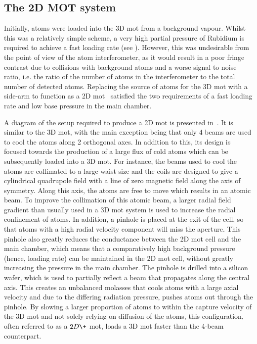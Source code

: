 \subsection{The 2D MOT system}\label{sec:2d_mot}
Initially, atoms were loaded into the 3D \ac{mot} from a background vapour. Whilst this was a relatively simple scheme, a very high partial pressure of Rubidium is required to achieve a fast loading rate (see ). However, this was undesirable from the point of view of the atom interferometer, as it would result in a poor fringe contrast due to collisions with background atoms and a worse signal to noise ratio, i.e. the ratio of the number of atoms in the interferometer to the total number of detected atoms. Replacing the source of atoms for the 3D \ac{mot} with a side-arm to function as a 2D \ac{mot}~\cite{Dieckmann1998} satisfied the two requirements of a fast loading rate and low base pressure in the main chamber. \par\noindent
A diagram of the setup required to produce a 2D \ac{mot} is presented in~. It is similar to the 3D \ac{mot}, with the main exception being that only 4 beams are used to cool the atoms along 2 orthogonal axes. In addition to this, its design is focused towards the production of a large flux of cold atoms which can be subsequently loaded into a 3D \ac{mot}. For instance, the beams used to cool the atoms are collimated to a large waist size and the coils are designed to give a cylindrical quadrupole field with a line of zero magnetic field along the axis of symmetry. Along this axis, the atoms are free to move which results in an atomic beam. To improve the collimation of this atomic beam, a larger radial field gradient than usually used in a 3D \ac{mot} system is used to increase the radial confinement of atoms. In addition, a pinhole is placed at the exit of the cell, so that atoms with a high radial velocity component will miss the aperture. This pinhole also greatly reduces the conductance between the 2D \ac{mot} cell and the main chamber, which means that a comparatively high background pressure (hence, loading rate) can be maintained in the 2D \ac{mot} cell, without greatly increasing the pressure in the main chamber. The pinhole is drilled into a silicon wafer, which is used to partially reflect a beam that propagates along the central axis. This creates an unbalanced molasses that cools atoms with a large axial velocity and due to the differing radiation pressure, pushes atoms out through the pinhole. By slowing a larger proportion of atoms to within the capture velocity of the 3D \ac{mot} and not solely relying on diffusion of the atoms, this configuration, often referred to as a \(2D\+\) \ac{mot}, loads a 3D \ac{mot} faster than the 4-beam counterpart. \par\noindent 
